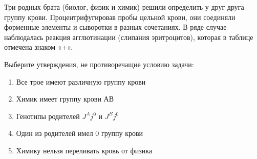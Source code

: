 
Три родных
брата (биолог, физик и химик) решили определить у друг друга группу крови.
Процентрифугировав пробы цельной крови, они соединяли форменные элементы и
сыворотки в разных сочетаниях. В ряде случае наблюдалась реакция агглютинации (слипания
эритроцитов), которая в таблице отмечена знаком «+».


Выберите утверждения, не противоречащие
условию задачи:

\begin{enumerate}
    \item Все трое имеют различную группу крови 
    \item Химик имеет группу крови АВ
    \item Генотипы родителей $J^Aj^0$ и $J^Bj^0$
    \item Один из родителей имел 0 группу крови
    \item Химику нельзя переливать кровь от физика
\end{enumerate}



